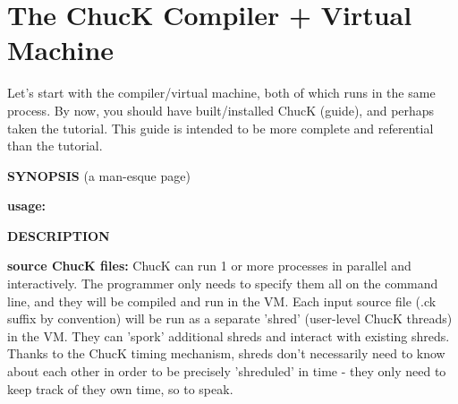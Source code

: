 \chapter{The ChucK Compiler + Virtual Machine}

Let's start with the compiler/virtual machine, both of which runs in the same process. By now, you should have built/installed ChucK (guide), and perhaps taken the tutorial. This guide is intended to be more complete and referential than the tutorial. 

{\bf SYNOPSIS} (a man-esque page) 

\begin{center}
{\bf usage:}
\end{center}




{\bf DESCRIPTION}

{\bf \myleft source ChucK files\myright:}
ChucK can run 1 or more processes in parallel and interactively. The programmer only needs to specify them all on the command line, and they will be compiled and run in the VM. Each input source file (.ck suffix by convention) will be run as a separate 'shred' (user-level ChucK threads) in the VM. They can 'spork' additional shreds and interact with existing shreds. Thanks to the ChucK timing mechanism, shreds don't necessarily need to know about each other in order to be precisely 'shreduled' in time - they only need to keep track of they own time, so to speak. 

